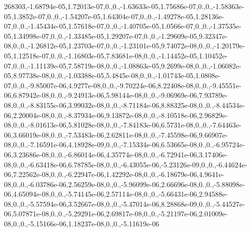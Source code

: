 \begin{DoxyCompactItemize}
268303,-\/1.\-68794e-\/05,1.\-72013e-\/07,0.,0.,-\/1.\-63633e-\/05,1.\-75686e-\/07,0.,0.,-\/1.\-58363e-\/05,1.\-3852e-\/07,0.,0.,-\/1.\-54207e-\/05,1.\-64304e-\/07,0.,0.,-\/1.\-49278e-\/05,1.\-28136e-\/07,0.,0.,-\/1.\-45434e-\/05,1.\-57618e-\/07,0.,0.,-\/1.\-40705e-\/05,1.\-0566e-\/07,0.,0.,-\/1.\-37535e-\/05,1.\-34998e-\/07,0.,0.,-\/1.\-33485e-\/05,1.\-29207e-\/07,0.,0.,-\/1.\-29609e-\/05,9.\-32347e-\/08,0.,0.,-\/1.\-26812e-\/05,1.\-23703e-\/07,0.,0.,-\/1.\-23101e-\/05,9.\-74072e-\/08,0.,0.,-\/1.\-20179e-\/05,1.\-12518e-\/07,0.,0.,-\/1.\-16803e-\/05,7.\-83681e-\/08,0.,0.,-\/1.\-14452e-\/05,1.\-10452e-\/07,0.,0.,-\/1.\-11139e-\/05,7.\-58719e-\/08,0.,0.,-\/1.\-08863e-\/05,9.\-2699e-\/08,0.,0.,-\/1.\-06082e-\/05,8.\-97738e-\/08,0.,0.,-\/1.\-03388e-\/05,5.\-4845e-\/08,0.,0.,-\/1.\-01743e-\/05,1.\-0808e-\/07,0.,0.,-\/9.\-85007e-\/06,4.\-9277e-\/08,0.,0.,-\/9.\-70224e-\/06,8.\-22408e-\/08,0.,0.,-\/9.\-45551e-\/06,6.\-87942e-\/08,0.,0.,-\/9.\-24913e-\/06,5.\-98144e-\/08,0.,0.,-\/9.\-06969e-\/06,7.\-93789e-\/08,0.,0.,-\/8.\-83155e-\/06,3.\-99032e-\/08,0.,0.,-\/8.\-71184e-\/06,8.\-88325e-\/08,0.,0.,-\/8.\-44534e-\/06,2.\-20004e-\/08,0.,0.,-\/8.\-37934e-\/06,9.\-13872e-\/08,0.,0.,-\/8.\-10518e-\/06,2.\-96829e-\/08,0.,0.,-\/8.\-01613e-\/06,5.\-81028e-\/08,0.,0.,-\/7.\-84183e-\/06,6.\-5731e-\/08,0.,0.,-\/7.\-64463e-\/06,3.\-66019e-\/08,0.,0.,-\/7.\-53483e-\/06,2.\-62811e-\/08,0.,0.,-\/7.\-45598e-\/06,9.\-66907e-\/08,0.,0.,-\/7.\-16591e-\/06,4.\-18928e-\/09,0.,0.,-\/7.\-15334e-\/06,6.\-53665e-\/08,0.,0.,-\/6.\-95724e-\/06,3.\-23686e-\/08,0.,0.,-\/6.\-86014e-\/06,4.\-35774e-\/08,0.,0.,-\/6.\-72941e-\/06,3.\-17406e-\/08,0.,0.,-\/6.\-63418e-\/06,6.\-78785e-\/08,0.,0.,-\/6.\-43055e-\/06,-\/5.\-23126e-\/09,0.,0.,-\/6.\-44624e-\/06,7.\-22562e-\/08,0.,0.,-\/6.\-22947e-\/06,1.\-42292e-\/08,0.,0.,-\/6.\-18679e-\/06,4.\-9641e-\/08,0.,0.,-\/6.\-03786e-\/06,2.\-56259e-\/08,0.,0.,-\/5.\-96099e-\/06,2.\-66696e-\/08,0.,0.,-\/5.\-88098e-\/06,4.\-65094e-\/08,0.,0.,-\/5.\-74145e-\/06,2.\-57114e-\/08,0.,0.,-\/5.\-66431e-\/06,2.\-94588e-\/08,0.,0.,-\/5.\-57594e-\/06,3.\-52667e-\/08,0.,0.,-\/5.\-47014e-\/06,8.\-28868e-\/09,0.,0.,-\/5.\-44527e-\/06,5.\-07871e-\/08,0.,0.,-\/5.\-29291e-\/06,2.\-69817e-\/08,0.,0.,-\/5.\-21197e-\/06,2.\-01009e-\/08,0.,0.,-\/5.\-15166e-\/06,1.\-18237e-\/08,0.,0.,-\/5.\-11619e-\/06
\end{DoxyCompactItemize}
